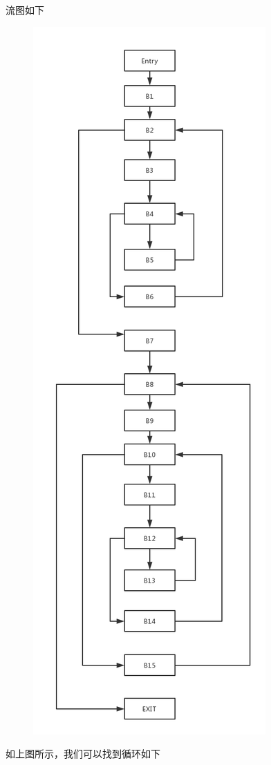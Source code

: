 \documentclass[a4paper, 16pt]{article}
\begin{document}
流图如下

\begin{figure}[H]
\centering
\includegraphics[scale=0.5]{chapter8_hw2_1}
\end{figure}
如上图所示，我们可以找到循环如下
\end{document}
